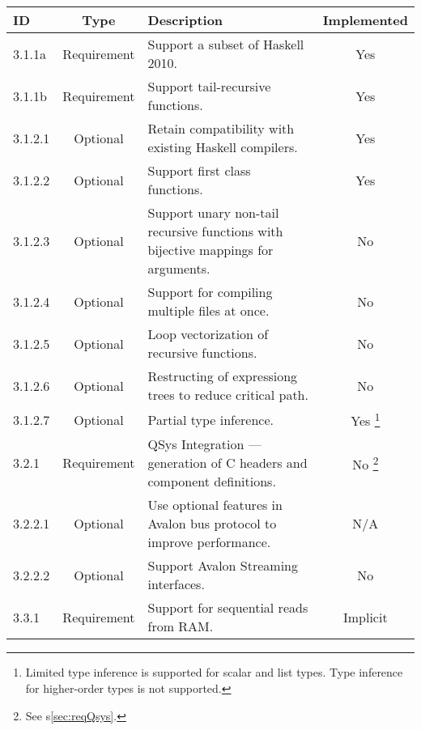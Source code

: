 \documentclass[english,onecolumn]{scrartcl}
\begin{document}
\begin{tabularx}{\textwidth}{l c X c}
\toprule
ID      & Type              & Description                 & Implemented
\\ \midrule

3.1.1a  & Requirement & Support a subset of Haskell 2010. & Yes
\\ \midrule

3.1.1b  & Requirement & Support tail-recursive functions. & Yes
\\ \midrule

3.1.2.1 & Optional    & Retain compatibility with existing Haskell compilers. & Yes
\\ \midrule

3.1.2.2 & Optional    & Support first class functions. & Yes
\\ \midrule

3.1.2.3 & Optional    & Support unary non-tail recursive functions with bijective mappings for arguments. & No
\\ \midrule

3.1.2.4 & Optional    & Support for compiling multiple files at once. & No
\\ \midrule

3.1.2.5 & Optional    & Loop vectorization of recursive functions. & No
\\ \midrule

3.1.2.6 & Optional    & Restructing of expressiong trees to reduce critical path. & No
\\ \midrule

3.1.2.7 & Optional    & Partial type inference. & Yes%
\footnote{Limited type inference is supported for scalar and list types. Type inference for higher-order types is not supported.}
\\ \midrule

3.2.1   & Requirement & QSys Integration --- generation of C headers and component definitions. & No%
\footnote{See s\ref{sec:reqQsys}.}
\\ \midrule

3.2.2.1 & Optional    & Use optional features in Avalon bus protocol to improve performance. & N/A
\\ \midrule

3.2.2.2 & Optional    & Support Avalon Streaming interfaces. & No
\\ \midrule

3.3.1   & Requirement & Support for sequential reads from RAM. & Implicit\footnotemark
\\ \midrule


\end{tabularx}
\end{document}
